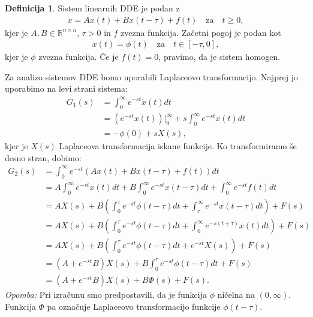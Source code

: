 \documentclass[12pt,a4paper]{amsart}
\theoremstyle{definition} %
\newtheorem{definicija}{Definicija}[section]
\theoremstyle{plain} %
\newcommand{\R}{\mathbb R}
\begin{document}
\begin{definicija}
    Sistem linearnih DDE je podan z 
    \begin{equation} \label{eq5}
        \begin{split}
            \dot{x}=Ax(t)+Bx(t-\tau)+f(t)\quad \text{za}\quad t\geq0,
        \end{split}
    \end{equation} kjer je
    $A,B\in\R^{n\times n}$, $\tau>0$ in $f$ zvezna funkcija. Začetni pogoj je podan kot
    \begin{equation} \label{eq6}
        \begin{split}
            x(t)=\phi(t)\quad \text{za}\quad t\in [-\tau,0],
        \end{split}
    \end{equation}
    kjer je $\phi$ zvezna funkcija. Če je $f(t)=0$, pravimo,
    da je sistem homogen.
\end{definicija}
Za analizo sistemov DDE bomo uporabili Laplaceovo transformacijo. Najprej jo uporabimo na levi strani sistema:
\begin{equation*}
    \begin{split}
        G_1(s)&= \int_0^{\infty}e^{-st}\dot{x}(t)dt \\
            &= (e^{-st}x(t))\Bigr|_{0}^{\infty} + s\int_0^{\infty}e^{-st}x(t)dt \\
            &= -\phi(0) + sX(s),
    \end{split}      
\end{equation*}
kjer je $X(s)$ Laplaceova transformacija iskane funkcije.
Ko transformiramo še desno stran, dobimo:
\begin{equation*}
    \begin{split}
        G_2(s)&= \int_0^{\infty}e^{-st}\left(Ax(t)+Bx(t-\tau)+f(t)\right)dt \\
            &= A\int_0^{\infty}e^{-st}x(t)dt+B\int_0^{\infty}e^{-st}x(t-\tau)dt+\int_0^{\infty}e^{-st}f(t)dt \\
            &= AX(s) + B\left(\int_0^{\tau}e^{-st}\phi(t-\tau)dt+\int_{\tau}^{\infty}e^{-st}x(t-\tau)dt\right) + F(s) \\
            &= AX(s) + B\left(\int_0^{\tau}e^{-st}\phi(t-\tau)dt+\int_{0}^{\infty}e^{-s(t+\tau)}x(t)dt\right) + F(s) \\
            &= AX(s) + B\left(\int_0^{\tau}e^{-st}\phi(t-\tau)dt+e^{-st}X(s)\right)+F(s) \\
            &= (A+e^{-st}B)X(s) + B\int_0^{\tau}e^{-st}\phi(t-\tau)dt+F(s) \\
            &= (A+e^{-st}B)X(s) + B\Phi(s)+F(s).
    \end{split}      
\end{equation*}
\textit{Opomba:} Pri izračunu smo predpostavili, da je funkcija $\phi$ ničelna na $(0,\infty)$. Funkcija $\Phi$ pa 
označuje Laplaceovo transformacijo funkcije $\phi(t-\tau)$.
\end{document}
